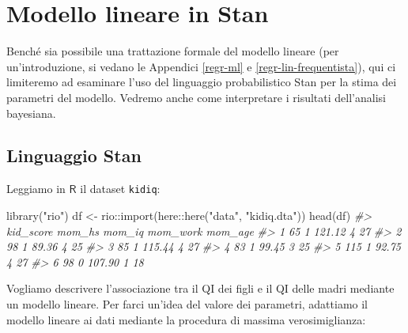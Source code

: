 \documentclass[
  11pt,
]{krantz}
\makeatletter
\newenvironment{Shaded}{\begin{snugshade}}{\end{snugshade}}
\newcommand{\CommentTok}[1]{\textcolor[rgb]{0.37,0.37,0.37}{\textit{#1}}}
\newcommand{\FunctionTok}[1]{\textcolor[rgb]{0,0,0}{#1}}
\newcommand{\NormalTok}[1]{#1}
\newcommand{\OtherTok}[1]{\textcolor[rgb]{0.37,0.37,0.37}{#1}}
\newcommand{\SpecialCharTok}[1]{\textcolor[rgb]{0,0,0}{#1}}
\newcommand{\StringTok}[1]{\textcolor[rgb]{0.5,0.5,0.5}{#1}}
\newenvironment{kframe}{%
\medskip{}
\setlength{\fboxsep}{.8em}
 \def\at@end@of@kframe{}%
 \ifinner\ifhmode%
  \def\at@end@of@kframe{\end{minipage}}%
  \begin{minipage}{\columnwidth}%
 \fi\fi%
 \def\FrameCommand##1{\hskip\@totalleftmargin \hskip-\fboxsep
 \colorbox{shadecolor}{##1}\hskip-\fboxsep
     \hskip-\linewidth \hskip-\@totalleftmargin \hskip\columnwidth}%
 \MakeFramed {\advance\hsize-\width
   \@totalleftmargin\z@ \linewidth\hsize
   \@setminipage}}%
 {\par\unskip\endMakeFramed%
 \at@end@of@kframe}
\renewenvironment{Shaded}{\begin{kframe}}{\end{kframe}}
\theoremstyle{definition}
\theoremstyle{definition}
\theoremstyle{definition}
\theoremstyle{definition}
\theoremstyle{remark}
\makeatother
\begin{document}
\hypertarget{reg-lin-stan}{%
\chapter{Modello lineare in Stan}\label{reg-lin-stan}}

Benché sia possibile una trattazione formale del modello lineare (per un'introduzione, si vedano le Appendici \ref{regr-ml} e \ref{regr-lin-frequentista}), qui ci limiteremo ad esaminare l'uso del linguaggio probabilistico Stan per la stima dei parametri del modello. Vedremo anche come interpretare i risultati dell'analisi bayesiana.

\hypertarget{linguaggio-stan}{%
\section{Linguaggio Stan}\label{linguaggio-stan}}

Leggiamo in \(\textsf{R}\) il dataset \texttt{kidiq}:

\begin{Shaded}
\begin{Highlighting}[]
\FunctionTok{library}\NormalTok{(}\StringTok{"rio"}\NormalTok{)}
\NormalTok{df }\OtherTok{\textless{}{-}}\NormalTok{ rio}\SpecialCharTok{::}\FunctionTok{import}\NormalTok{(here}\SpecialCharTok{::}\FunctionTok{here}\NormalTok{(}\StringTok{"data"}\NormalTok{, }\StringTok{"kidiq.dta"}\NormalTok{))}
\FunctionTok{head}\NormalTok{(df)}
\CommentTok{\#\textgreater{}   kid\_score mom\_hs mom\_iq mom\_work mom\_age}
\CommentTok{\#\textgreater{} 1        65      1 121.12        4      27}
\CommentTok{\#\textgreater{} 2        98      1  89.36        4      25}
\CommentTok{\#\textgreater{} 3        85      1 115.44        4      27}
\CommentTok{\#\textgreater{} 4        83      1  99.45        3      25}
\CommentTok{\#\textgreater{} 5       115      1  92.75        4      27}
\CommentTok{\#\textgreater{} 6        98      0 107.90        1      18}
\end{Highlighting}
\end{Shaded}

Vogliamo descrivere l'associazione tra il QI dei figli e il QI delle madri mediante un modello lineare. Per farci un'idea del valore dei parametri, adattiamo il modello lineare ai dati mediante la procedura di massima verosimiglianza:
\end{document}

